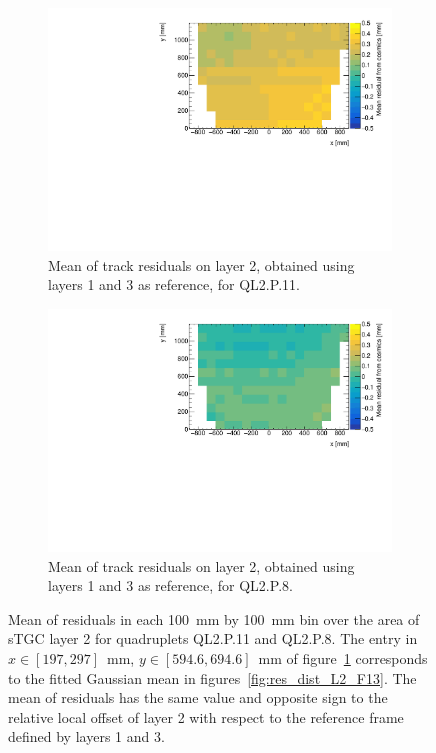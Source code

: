 \newpage
\thispagestyle{empty}
\begin{figure}
\centering
\begin{subfigure}{\textwidth}
  \centering
  \includegraphics[width=\linewidth]{figures/figure_QL2P11_3100V_2021-08-05_th2_means_layer2_fixedlayers13.pdf}
  \caption{Mean of track residuals on layer 2, obtained using layers 1 and 3 as reference, for QL2.P.11.}
  \label{fig:res_mean_th2_ql2p11}
\end{subfigure}%
\vspace*{\floatsep}
\begin{subfigure}{\textwidth}
  \centering
  \includegraphics[width=\linewidth]{figures/figure_QL2P08_3100V_2021-08-03_th2_means_layer2_fixedlayers13.pdf}
  \caption{Mean of track residuals on layer 2, obtained using layers 1 and 3 as reference, for QL2.P.8.}
  \label{fig:res_mean_th2_ql2p8}
\end{subfigure}
\caption{Mean of residuals in each \SI{100}{\milli\meter} by \SI{100}{\milli\meter} bin over the area of sTGC layer 2 for quadruplets QL2.P.11 and QL2.P.8. The entry in $x\in\left[197, 297\right]$~mm,  $y\in\left[594.6, 694.6\right]$~mm of figure~\ref{fig:res_mean_th2_ql2p11} corresponds to the fitted Gaussian mean in figures~\ref{fig:res_dist_L2_F13}. The mean of residuals has the same value and opposite sign to the relative local offset of layer 2 with respect to the reference frame defined by layers 1 and 3.}
\label{fig:res_mean_th2}
\end{figure}
